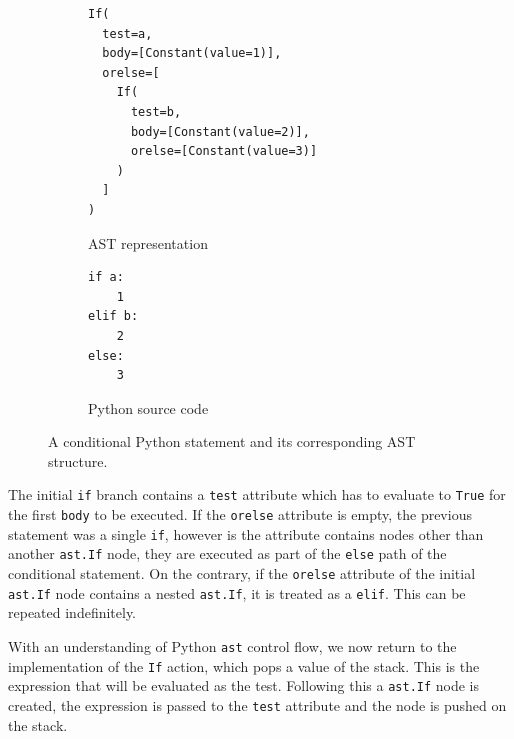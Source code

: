 \begin{figure}[htbp]\label{fig:python-if-ast}
  \centering

  \begin{subfigure}[t]{0.48\textwidth}
    \begin{lstlisting}[style=python]
If(
  test=a,
  body=[Constant(value=1)],
  orelse=[
    If(
      test=b,
      body=[Constant(value=2)],
      orelse=[Constant(value=3)]
    )
  ]
)
    \end{lstlisting}
    \caption{AST representation}
  \end{subfigure}
  \hfill
  \begin{subfigure}[t]{0.4\textwidth}
    \begin{lstlisting}[style=python]
if a:
    1
elif b:
    2
else:
    3
    \end{lstlisting}
    \caption{Python source code}
  \end{subfigure}

  \caption{A conditional Python statement and its corresponding AST structure.}
  
\end{figure}

The initial \texttt{if} branch contains a \texttt{test} attribute which has to evaluate to \texttt{True} for the first \texttt{body} to be executed. If the \texttt{orelse} attribute is empty, the previous statement was a single \texttt{if}, however is the attribute contains nodes other than another \texttt{ast.If} node, they are executed as part of the \texttt{else} path of the conditional statement. On the contrary, if the \texttt{orelse} attribute of the initial \texttt{ast.If} node contains a nested \texttt{ast.If}, it is treated as a \texttt{elif}. This can be repeated indefinitely.

With an understanding of Python \texttt{ast} control flow, we now return to the implementation of the \texttt{If} action, which pops a value of the stack. This is the expression that will be evaluated as the test. Following this a \texttt{ast.If} node is created, the expression is passed to the \texttt{test} attribute and the node is pushed on the stack.

